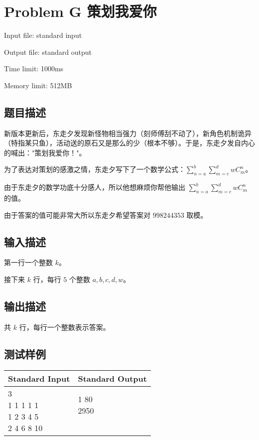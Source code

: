 \newpage
\section{Problem G 策划我爱你}
{ \limitfont{}
Input file: standard input \par
Output file: standard output \par
Time limit: 1000ms \par
Memory limit: 512MB \par
}
\subsection*{题目描述}

新版本更新后，东走夕发现新怪物相当强力（刻师傅刮不动了），新角色机制诡异（特指某只鱼），活动送的原石又是那么的少（根本不够）。于是，东走夕发自内心的喊出："策划我爱你！"。

为了表达对策划的感激之情，东走夕写下了一个数学公式：$\displaystyle \sum^{b}_{n=a}\displaystyle \sum^{d}_{m=c}wC_{m}^{n}$。

由于东走夕的数学功底十分感人，所以他想麻烦你帮他输出 $\displaystyle \sum^{b}_{n=a}\displaystyle \sum^{d}_{m=c}wC_{m}^{n}$ 的值。

由于答案的值可能非常大所以东走夕希望答案对 $998244353$ 取模。

\subsection*{输入描述}

第一行一个整数 $k$。

接下来 $k$ 行，每行 $5$ 个整数 $a,b,c,d,w$。

\subsection*{输出描述}

共 $k$ 行，每行一个整数表示答案。

\subsection*{测试样例}

\begin{table}[H]
\begin{tabularx}{\textwidth}{|X|X|}
    \hline
    \textbf{Standard Input} & \textbf{Standard Output} \\ 
    \hline
    \tablecell{
        3 \\
        1 1 1 1 1 \\
        1 2 3 4 5 \\
        2 4 6 8 10 \\
    } & \tablecell{
        1
        80 \\
        2950 \\
        \\
    } \\
    \hline
\end{tabularx}
\end{table}

